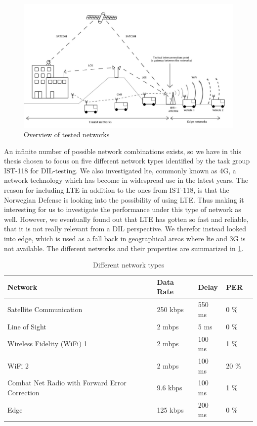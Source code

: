 \begin{figure}[h]
\includegraphics[scale=0.25]{images/networks_overview.pdf}
\caption{Overview of tested networks}
\label{figure-networks-overview}
\end{figure}

An infinite number of possible network combinations exists, so we have in this
thesis chosen to focus on five different network types identified by the task
group IST-118 for DIL-testing. We also investigated \gls{lte}, commonly known as
4G, a network technology which has become in widespread use in the latest years.
The reason for including LTE in addition to the ones from IST-118, is that the
Norwegian Defense is looking into the possibility of using LTE. Thus making it
interesting for us to investigate the performance under this type of network as
well. However, we eventually found out that LTE has gotten so fast and reliable,
that it is not really relevant from a DIL perspective. We therefor instead
looked into \gls{edge}, which is used as a fall back in geographical areas where
\gls{lte} and 3G is not available. The different networks and their properties
are summarized in \cref{table-network-types}.

\begin{table}[h]
\begin{tabular}{| l | l | l | l | l |}
\hline
  \textbf{Network} & \textbf{Data Rate} & \textbf{Delay} & \textbf{PER} \\ \hline
  Satellite Communication & 250 kbps & 550 ms & 0 \% \\ \hline
  Line of Sight & 2 mbps & 5 ms & 0 \% \\ \hline
  Wireless Fidelity (WiFi) 1 & 2 mbps & 100 ms & 1 \% \\ \hline
  WiFi 2 & 2 mbps & 100 ms & 20 \% \\ \hline
  Combat Net Radio with Forward Error Correction & 9.6 kbps & 100 ms & 1 \% \\ \hline
  Edge & 125 kbps & 200 ms & 0 \% \\ \hline
\end{tabular}
\caption{Different network types}
\label{table-network-types}
\end{table}


